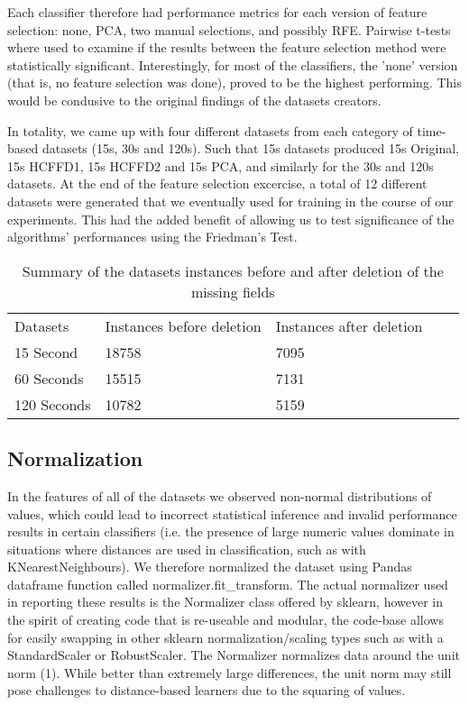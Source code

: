 \documentclass[conference]{IEEEtran}
\begin{document}
Each classifier therefore had performance metrics for each version of feature selection: none, PCA, two manual selections, and possibly RFE. Pairwise t-tests where used to examine if the results between the feature selection method were statistically significant. Interestingly, for most of the classifiers, the 'none' version (that is, no feature selection was done), proved to be the highest performing. This would be condusive to the original findings of the datasets creators.

In totality, we came up with four different datasets from each category of time-based datasets (15s, 30s and 120s). Such that 15s datasets produced 15s Original, 15s HCFFD1, 15s HCFFD2 and 15s PCA, and similarly for the 30s and 120s datasets. At the end of the feature selection excercise, a total of 12 different datasets were generated that we eventually used for training in the course of our experiments. This had the added benefit of allowing us to test significance of the algorithms' performances using the Friedman's Test.

\begin{table}[h]
\caption {Summary of the datasets instances before and after deletion of the missing fields}
\begin{tabular}{|l|l|l|ll}
\cline{1-3}
Datasets    & Instances before deletion & Instances after  deletion&  &  \\ \cline{1-3}
15 Second   & 18758                                      & 7095                                           &  &  \\ \cline{1-3}
60 Seconds  & 15515                                      & 7131                                           &  &  \\ \cline{1-3}
120 Seconds & 10782                                      & 5159                                           &  &  \\ \cline{1-3}
\end{tabular}
\label{fig:datasetcleasing}
\end{table}
\subsection{Normalization}
In the features of all of the datasets we observed non-normal distributions of values, which could lead to incorrect statistical inference and invalid performance results in certain classifiers (i.e. the presence of large numeric values dominate in situations where distances are used in classification, such as with KNearestNeighbours). We therefore normalized the dataset using Pandas dataframe function called normalizer.fit\_transform. The actual normalizer used in reporting these results is the Normalizer class offered by sklearn, however in the spirit of creating code that is re-useable and modular, the code-base allows for easily swapping in other sklearn normalization/scaling types such as with a StandardScaler or RobustScaler. The Normalizer normalizes data around the unit norm (1). While better than extremely large differences, the unit norm may still pose challenges to distance-based learners due to the squaring of values.
\end{document}
